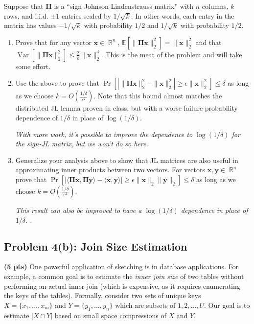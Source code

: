 \documentclass[10pt]{article}
\DeclareMathOperator{\R}{\mathbb{R}}
\newcommand{\E}{\mathbb{E}}
\DeclareMathOperator{\Var}{Var}
\newcommand{\bs}[1]{\boldsymbol{#1}}
\newcommand{\bv}[1]{\mathbf{#1}}
\begin{document}
Suppose that $\bs{\Pi}$ is a ``sign Johnson-Lindenstrauss matrix'' with $n$ columns, $k$ rows, and i.i.d. $\pm 1$ entries scaled by $1/\sqrt{k}$. In other words, each entry in the matrix has values $-1/\sqrt{k}$ with probability $1/2$ and $1/\sqrt{k}$ with probability $1/2$.
\begin{enumerate}
	\item Prove that for any vector $\bv{x}\in \R^n$, $\E[\|\bs{\Pi}\bv{x}\|_2^2] = \|\bv{x}\|_2^2$ and that $\Var[\|\bs{\Pi}\bv{x}\|_2^2] \leq \frac{2}{k}\|\bv{x}\|_2^4$. This is the meat of the problem and will take some effort. 
	\vspace{.5em}

	
	\item Use the above to prove that $\Pr\left[\left|\|\bs{\Pi}\bv{x}\|_2^2 - \|\bv{x}\|_2^2\right| \geq \epsilon\|\bv{x}\|_2^2 \right] \leq \delta$ as long as we choose $k = O\left(\frac{1/\delta}{\epsilon^2}\right)$. Note that this bound almost matches the distributed JL lemma proven in class, but with a worse failure probability dependence of $1/\delta$ in place of $\log(1/\delta)$. 
	\vspace{.5em}
	
	\textit{With more work, it's possible to improve the dependence to $\log(1/\delta)$ for the sign-JL matrix, but we won't do so here.}
	
	\item Generalize your analysis above to show that JL matrices are also useful in approximating inner products between two vectors. For vectors $\bv{x},\bv{y}\in \R^n$ prove that $\Pr\left[\left|\langle \bs{\Pi}\bv{x}, \bs{\Pi}\bv{y}\rangle -  \langle  \bv{x}, \bv{y}\rangle\right| \geq \epsilon\|\bv{x}\|_2\|\bv{y}\|_2\right] \leq \delta$ as long as we choose $k = O\left(\frac{1/\delta}{\epsilon^2}\right)$.
	
		\textit{This result can also be improved to have a $\log(1/\delta)$ dependence in place of $1/\delta$. .}
\end{enumerate}

\subsection{Problem 4(b): Join Size Estimation}
\noindent\textbf{(5 pts)}
One powerful application of sketching is in database applications. For example, a common goal is to estimate the \emph{inner join size} of two tables without performing an actual inner join (which is expensive, as it requires enumerating the keys of the tables). Formally, consider two sets of unique keys $X = \{x_1, \ldots, x_m\}$ and $Y = \{y_1, \ldots, y_n\}$ which are subsets of $1,2, \ldots, U$.  Our goal is to estimate $|X\cap Y|$ based on small space compressions of $X$ and $Y$.  
\end{document}

